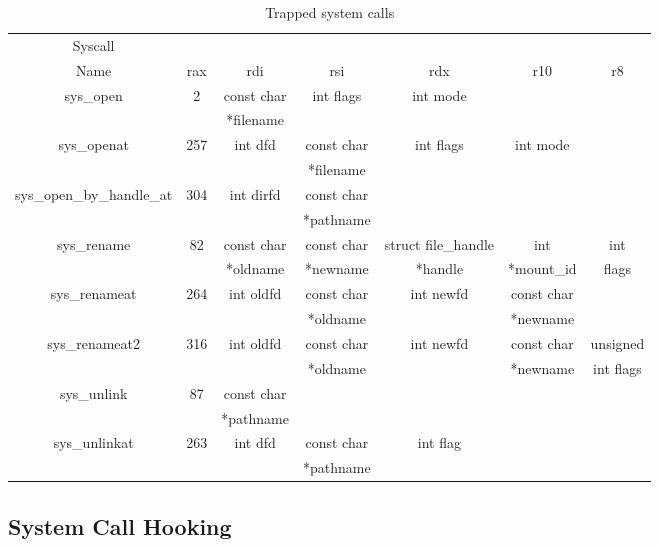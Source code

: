 \begin{table}[ht]
	\centering
	\footnotesize
	\caption{Trapped system calls}
	\label{tbl:prototypes}
	\begin{tabular}{ccccccc}
		\toprule
		Syscall 					&           	&  				& 				&  						&  					&   		\\
		Name 						& rax		  	& rdi 			& rsi 			& rdx 					& r10 				& r8 		\\
		\toprule
		sys\_open 					& 2 			&	const char	&	int flags	&	int mode			&					&		 	\\
					 				&   			&	*filename	&				&						&					&		 	\\
		\hline
		sys\_openat 				& 257  			&	int dfd		&	const char 	&	int flags			&	int mode		&	 		\\
					 				&   			&				&	*filename	&						&					&		 	\\
		\hline
		sys\_open\_by\_handle\_at 	& 304  			&	int dirfd	&	const char	&						&					&		 	\\
									&   			&				&	*pathname	&						&					&		 	\\
		\hline
		sys\_rename 				& 82  			&	const char	&	const char	&	struct file\_handle	&	int 			&	int 	\\
					 				&   			&	*oldname	&	*newname	&	*handle				&	*mount\_id		&	flags	\\
		\hline
		sys\_renameat 				& 264  			&	int oldfd	&	const char 	&	int newfd			&	const char 		&	 		\\
					 				&   			&				&	*oldname	&						&	*newname		& 			\\ 
		\hline
		sys\_renameat2 				& 316  			&	int oldfd	&	const char 	&	int newfd			&	const char 		&	unsigned 		\\
									&   			&				&	*oldname	&						&	*newname		& 	int flags		\\ 
		\hline
		sys\_unlink 				& 87  			&	const char	&				&						&					&		 	\\
					 				&   			&	*pathname	&				&						&					&		 	\\ 
		\hline
		sys\_unlinkat 				& 263  			&	int dfd		&	const char	&	int flag			&					&		 	\\
					 				&   			&				&	*pathname	&						&					&		 	\\
		\bottomrule
	\end{tabular}	
\end{table}



\subsection{System Call Hooking}\label{sub:hooking}

